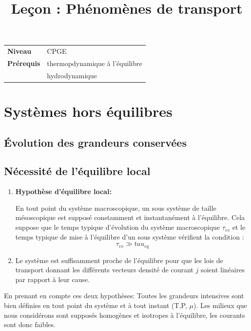 \documentclass[10pt]{beamer}
\title{Leçon : Phénomènes de transport}
\begin{document}
\begin{frame}{}
    \titlepage

    \begin{tabularx}{\textwidth}{l@{:\,\,}X}
        \textbf{Niveau} 	  & CPGE\\
        \textbf{Prérequis} & thermopdynamique à l'équilibre \\
        & hydrodynamique
    \end{tabularx}
\end{frame}

\begin{frame}
    \tableofcontents
\end{frame}

\section{Systèmes hors équilibres}
\subsection{Évolution des grandeurs conservées}


\subsection{Nécessité de l'équilibre local}

\begin{frame}{\insertsubsection}
\begin{enumerate}
    \item \textbf{Hypothèse d'équilibre local:}

    En tout point du système macroscopique, un sous système de taille mésoscopique est supposé constamment et instantanément à l'équilibre. Cela suppose que le temps typique d'évolution du système macroscopique $\tau_{ev}$ et le temps typique de mise à l'équilibre d'un sous système vérifient la condition : 
    $$\tau_{ev} \gg tau_{eq}$$

    \item Le système est suffisamment proche de l'équilibre pour que les lois de transport donnant les différents vecteurs densité de courant $j$ soient linéaires par rapport à leur cause.
\end{enumerate}

En prenant en compte ces deux hypothèses: Toutes les grandeurs intensives sont bien définies en tout point du système et à tout instant (T,P, $\mu$). Les milieux que nous considérons sont supposés homogènes et isotropes à l'équilibre, les courants sont donc faibles.

\end{frame}
\end{document}
